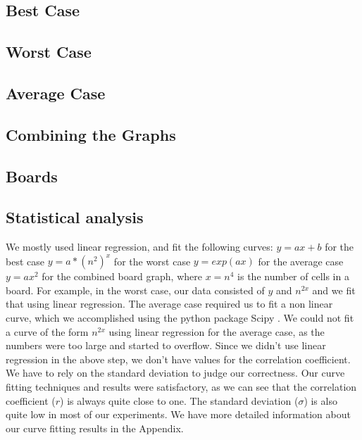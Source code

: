 \documentclass[16pt]{article}
\begin{document}
\newpage
\subsection{Best Case}

\subsection{Worst Case}

\subsection{Average Case}

\subsection{Combining the Graphs}


\subsection{Boards}





\subsection{Statistical analysis}    
We mostly used linear regression, and fit the following curves:
\newline
$y = a x + b$ for the best case
\newline
$y = a * (n^2)^x$ for the worst case
\newline
$y = exp(a x)$ for the average case
\newline
$y = a x ^ 2$ for the combined board graph, where $x = n^4$ is the number of cells in a board. 
\newline
For example, in the worst case, our data consisted of $y$ and $n^{2 x}$ and we fit that using linear regression.
\newline
\newline
The average case required us to fit a non linear curve, which we accomplished using the python package Scipy \cite{scipy}.
\newline
We could not fit a curve of the form $n^{2 x}$ using linear regression for the average case, as the numbers were too large and started to overflow.
\newline
Since we didn't use linear regression in the above step, we don't have values for the correlation coefficient. We have to rely on the standard deviation to judge our correctness.
\newline
\newline
Our curve fitting techniques and results were satisfactory, as we can see that the correlation coefficient ($r$) is always quite close to one. The standard deviation ($\sigma$) is also quite low in most of our experiments.
\newline
We have more detailed information about our curve fitting results in the Appendix.
\newline
\newline
\end{document}
